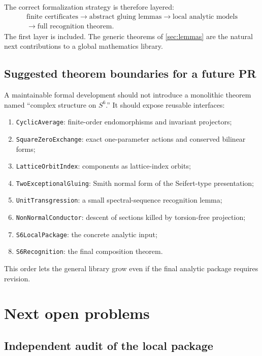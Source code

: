 \documentclass[11pt,reqno]{amsart}
\numberwithin{equation}{section}
\theoremstyle{definition}
\begin{document}
The correct formalization strategy is therefore layered:
\[
\begin{gathered}
\text{finite certificates}
\longrightarrow
\text{abstract gluing lemmas}
\longrightarrow
\text{local analytic models}
\\[-1pt]
\longrightarrow
\text{full recognition theorem}.
\end{gathered}
\]
The first layer is included. The generic theorems of \cref{sec:lemmas} are the natural next contributions to a global mathematics library.

\subsection{Suggested theorem boundaries for a future PR}

A maintainable formal development should not introduce a monolithic theorem named ``complex structure on $S^6$.'' It should expose reusable interfaces:
\begin{enumerate}
\item \texttt{CyclicAverage}: finite-order endomorphisms and invariant projectors;
\item \texttt{SquareZeroExchange}: exact one-parameter actions and conserved bilinear forms;
\item \texttt{LatticeOrbitIndex}: components as lattice-index orbits;
\item \texttt{TwoExceptionalGluing}: Smith normal form of the Seifert-type presentation;
\item \texttt{UnitTransgression}: a small spectral-sequence recognition lemma;
\item \texttt{NonNormalConductor}: descent of sections killed by torsion-free projection;
\item \texttt{S6LocalPackage}: the concrete analytic input;
\item \texttt{S6Recognition}: the final composition theorem.
\end{enumerate}
This order lets the general library grow even if the final analytic package requires revision.

\section{Next open problems}\label{sec:open}

\subsection{Independent audit of the local package}
\end{document}
